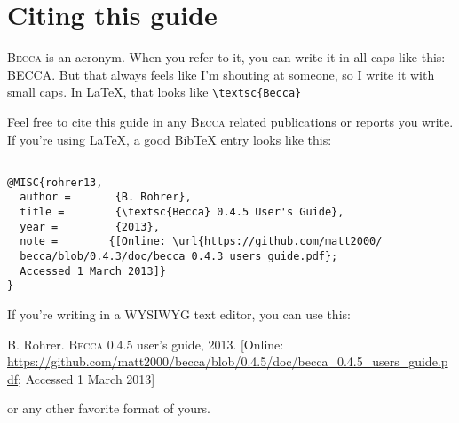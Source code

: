 \chapter{Citing this guide}

\textsc{Becca} is an acronym. When you refer to it, you can write it in all caps like this: BECCA. But that always feels like I'm shouting at someone, so I write it with small caps. In \LaTeX, that looks like \verb+\textsc{Becca} +

Feel free to cite this guide in any \textsc{Becca} related publications or reports you write. If you're using \LaTeX, a good BibTeX entry looks like this:

\begin{verbatim}

@MISC{rohrer13,
  author =       {B. Rohrer},
  title =        {\textsc{Becca} 0.4.5 User's Guide},
  year =         {2013},
  note =        {[Online: \url{https://github.com/matt2000/
  becca/blob/0.4.3/doc/becca_0.4.3_users_guide.pdf}; 
  Accessed 1 March 2013]}
}

\end{verbatim}

If you're writing in a WYSIWYG text editor, you can use this:

B. Rohrer. \textsc{Becca} 0.4.5 user's guide, 2013. [Online: \url{https://github.com/matt2000/becca/blob/0.4.5/doc/becca_0.4.5_users_guide.pdf}; Accessed 1 March 2013]

or any other favorite format of yours. 



 
